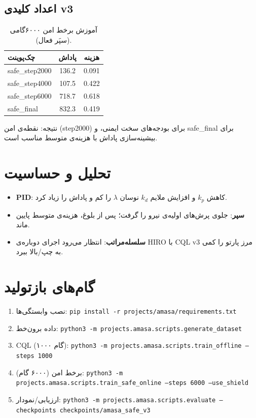 \documentclass[conference]{IEEEtran}
\begin{document}
\subsection{اعداد کلیدی v3}
\begin{table}[h]
\centering
\begin{tabular}{lcc}
\toprule
چک‌پوینت & پاداش & هزینه \\
\midrule
safe\_step2000 & 136.2 & 0.091 \\
safe\_step4000 & 107.5 & 0.422 \\
safe\_step6000 & 718.7 & 0.618 \\
safe\_final    & 832.3 & 0.419 \\
\bottomrule
\end{tabular}
\caption{آموزش برخط امن ۶۰۰۰‌گامی (سپَر فعال).}
\end{table}
نتیجه: نقطه‌ی امن (step2000) برای بودجه‌های سخت ایمنی، و safe\_final برای بیشینه‌سازی پاداش با هزینه‌ی متوسط مناسب است.

\section{تحلیل و حساسیت}
\begin{itemize}[leftmargin=*]
    \item \textbf{PID}: کاهش $k_p$ و افزایش ملایم $k_d$ نوسان $\lambda$ را کم و پاداش را زیاد کرد.
    \item \textbf{سپر}: جلوی پرش‌های اولیه‌ی نیرو را گرفت؛ پس از بلوغ، هزینه‌ی متوسط پایین ماند.
    \item \textbf{سلسله‌مراتب}: انتظار می‌رود اجرای دوباره‌ی HIRO با CQL v3 مرز پارتو را کمی به چپ/بالا ببرد.
\end{itemize}

\section{گام‌های بازتولید}
\begin{enumerate}[leftmargin=*]
    \item نصب وابستگی‌ها: \texttt{pip install -r projects/amasa/requirements.txt}
    \item داده برون‌خط: \texttt{python3 -m projects.amasa.scripts.generate\_dataset}
    \item CQL (۱۰۰۰ گام): \texttt{python3 -m projects.amasa.scripts.train\_offline --steps 1000}
    \item برخط امن (۶۰۰۰ گام): \texttt{python3 -m projects.amasa.scripts.train\_safe\_online --steps 6000 --use\_shield}
    \item ارزیابی/نمودار: \texttt{python3 -m projects.amasa.scripts.evaluate --checkpoints checkpoints/amasa\_safe\_v3}
\end{enumerate}
\end{document}
